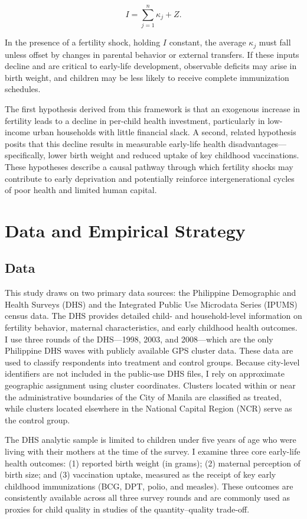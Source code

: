 \documentclass[]{AEA}
\begin{document}
\[
I = \sum_{j=1}^{n} \kappa_j + Z.
\]

In the presence of a fertility shock, holding \(I\) constant, the
average \(\kappa_j\) must fall unless offset by changes in parental
behavior or external transfers. If these inputs decline and are critical
to early-life development, observable deficits may arise in birth
weight, and children may be less likely to receive complete immunization
schedules.

The first hypothesis derived from this framework is that an exogenous
increase in fertility leads to a decline in per-child health investment,
particularly in low-income urban households with little financial slack.
A second, related hypothesis posits that this decline results in
measurable early-life health disadvantages---specifically, lower birth
weight and reduced uptake of key childhood vaccinations. These
hypotheses describe a causal pathway through which fertility shocks may
contribute to early deprivation and potentially reinforce
intergenerational cycles of poor health and limited human capital.

\section{Data and Empirical Strategy}

\subsection{Data}

This study draws on two primary data sources: the Philippine Demographic
and Health Surveys (DHS) and the Integrated Public Use Microdata Series
(IPUMS) census data. The DHS provides detailed child- and
household-level information on fertility behavior, maternal
characteristics, and early childhood health outcomes. I use three rounds
of the DHS---1998, 2003, and 2008---which are the only Philippine DHS
waves with publicly available GPS cluster data. These data are used to
classify respondents into treatment and control groups. Because
city-level identifiers are not included in the public-use DHS files, I
rely on approximate geographic assignment using cluster coordinates.
Clusters located within or near the administrative boundaries of the
City of Manila are classified as treated, while clusters located
elsewhere in the National Capital Region (NCR) serve as the control
group.

The DHS analytic sample is limited to children under five years of age
who were living with their mothers at the time of the survey. I examine
three core early-life health outcomes: (1) reported birth weight (in
grams); (2) maternal perception of birth size; and (3) vaccination
uptake, measured as the receipt of key early childhood immunizations
(BCG, DPT, polio, and measles). These outcomes are consistently
available across all three survey rounds and are commonly used as
proxies for child quality in studies of the quantity--quality trade-off.
\end{document}
